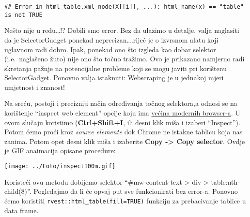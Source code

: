 \documentclass[
]{article}
\newenvironment{Shaded}{\begin{snugshade}}{\end{snugshade}}
\newcommand{\DataTypeTok}[1]{\textcolor[rgb]{0.13,0.29,0.53}{#1}}
\newcommand{\KeywordTok}[1]{\textcolor[rgb]{0.13,0.29,0.53}{\textbf{#1}}}
\newcommand{\NormalTok}[1]{#1}
\newcommand{\OperatorTok}[1]{\textcolor[rgb]{0.81,0.36,0.00}{\textbf{#1}}}
\newcommand{\OtherTok}[1]{\textcolor[rgb]{0.56,0.35,0.01}{#1}}
\newcommand{\StringTok}[1]{\textcolor[rgb]{0.31,0.60,0.02}{#1}}
\begin{document}
\begin{verbatim}
## Error in html_table.xml_node(X[[i]], ...): html_name(x) == "table" is not TRUE
\end{verbatim}

Nešto nije u redu\ldots!? Dobili smo error. Bez da ulazimo u detalje,
valja naglasiti da je SelectorGadget ponekad neprecizan\ldots.riječ je o
izvrsnom alatu koji uglavnom radi dobro. Ipak, ponekad ono što izgleda
kao dobar selektor (i.e.~naglašeno žuto) nije ono što točno tražimo. Ovo
je prikazano namjerno radi skretanja pažnje na potencijalne probleme
koji se mogu javiti pri korištenu SelectorGadget. Ponovno valja
istaknuti: Webscraping je u jednakoj mjeri umjetnost i znanost!

Na sreću, postoji i precizniji način određivanja točnog selektora,a
odnosi se na korištenje ``inspect web element'' opcije koju ima
\href{https://www.lifewire.com/get-inspect-element-tool-for-browser-756549}{većina
modernih browser-a}. U ovom slučaju koristimo (\textbf{Ctrl+Shift+I},
ili desni klik miša i izaberi ``Inspect''). Potom ćemo proći kroz
\emph{source elemente} dok Chrome ne istakne tablicu koja nas zanima.
Potom opet desni klik miša i izaberite \textbf{Copy -\textgreater{} Copy
selector}. Ovdje je GIF anaimacija opisane procedure:

\texttt{[image: ../Foto/inspect100m.gif]}

Koristeći ovu metodu dobijemo selektor ``\#mw-content-text
\textgreater{} div \textgreater{} table:nth-child(8)''. Pogledajmo da li
će opvaj put sve funkcionirati bez error-a. Ponovno ćemo koristiti
\texttt{rvest::html\_table(fill=TRUE)} funkciju za prebacivanje tablice
u data frame.

\begin{Shaded}
\end{Shaded}
\end{document}
